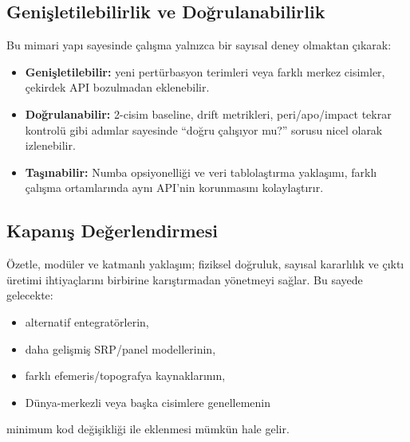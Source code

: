 \subsection{Genişletilebilirlik ve Doğrulanabilirlik}

Bu mimari yapı sayesinde çalışma yalnızca bir sayısal deney olmaktan çıkarak:
\begin{itemize}
  \item \textbf{Genişletilebilir:} yeni pertürbasyon terimleri veya farklı merkez cisimler,
  çekirdek API bozulmadan eklenebilir.
  \item \textbf{Doğrulanabilir:} 2-cisim baseline, drift metrikleri, peri/apo/impact tekrar kontrolü gibi
  adımlar sayesinde “doğru çalışıyor mu?” sorusu nicel olarak izlenebilir.
  \item \textbf{Taşınabilir:} Numba opsiyonelliği ve veri tablolaştırma yaklaşımı,
  farklı çalışma ortamlarında aynı API’nin korunmasını kolaylaştırır.
\end{itemize}

\subsection{Kapanış Değerlendirmesi}

Özetle, modüler ve katmanlı yaklaşım; fiziksel doğruluk, sayısal kararlılık ve çıktı üretimi
ihtiyaçlarını birbirine karıştırmadan yönetmeyi sağlar.
Bu sayede gelecekte:
\begin{itemize}
  \item alternatif entegratörlerin,
  \item daha gelişmiş SRP/panel modellerinin,
  \item farklı efemeris/topografya kaynaklarının,
  \item Dünya-merkezli veya başka cisimlere genellemenin
\end{itemize}
minimum kod değişikliği ile eklenmesi mümkün hale gelir.
